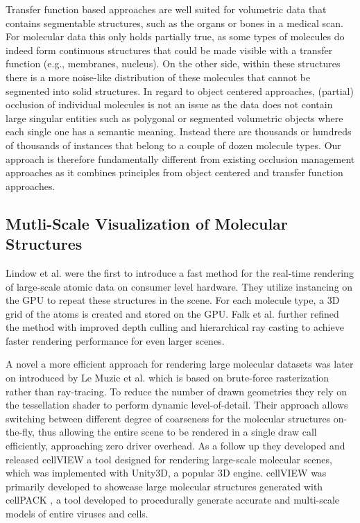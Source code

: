 Transfer function based approaches are well suited for volumetric data that contains segmentable structures, such as the organs or bones in a medical scan. For molecular data this only holds partially true, as some types of molecules do indeed form continuous structures that could be made visible with a transfer function (e.g., membranes, nucleus). On the other side, within these structures there is a more noise-like distribution of these molecules that cannot be segmented into solid structures. 
In regard to object centered approaches, (partial) occlusion of individual molecules is not an issue as the data does not contain large singular entities such as polygonal or segmented volumetric objects where each single one has a semantic meaning. Instead there are thousands or hundreds of thousands of instances that belong to a couple of dozen molecule types.
Our approach is therefore fundamentally different from existing occlusion management approaches as it combines principles from object centered and transfer function approaches. 


\subsection{Mutli-Scale Visualization of Molecular Structures}
Lindow et al. \cite{lindow15} were the first to introduce a fast method for the real-time rendering of large-scale atomic data on consumer level hardware. They utilize instancing on the GPU to repeat these structures in the scene. For each molecule type, a 3D grid of the atoms is created and stored on the GPU. Falk et al. \cite{falk13} further refined the method with improved depth culling and hierarchical ray casting to achieve faster rendering performance for even larger scenes. 

A novel a more efficient approach for rendering large molecular datasets was later on introduced by Le Muzic et al. \cite{le2014illustrative} which is based on brute-force rasterization rather than ray-tracing. To reduce the number of drawn geometries they rely on the tessellation shader to perform dynamic level-of-detail. Their approach allows switching between different degree of coarseness for the molecular structures on-the-fly, thus allowing the entire scene to be rendered in a single draw call efficiently, approaching zero driver overhead. As a follow up they developed and released cellVIEW \cite{muzic15} a tool designed for rendering large-scale molecular scenes, which was implemented with Unity3D, a popular 3D engine. cellVIEW was primarily developed to showcase large molecular structures generated with cellPACK \cite{cellpack}, a tool developed to procedurally generate accurate and multi-scale models of entire viruses and cells.


